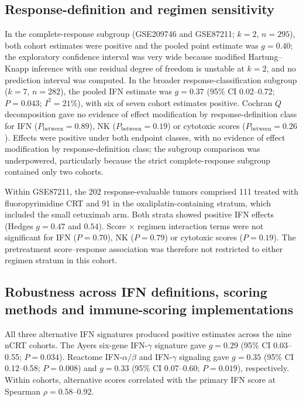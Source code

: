 \documentclass[11pt,a4paper]{article}
\begin{document}
\subsection{Response-definition and regimen sensitivity}

In the complete-response subgroup (GSE209746 and GSE87211; $k=2$, $n=295$), both cohort estimates were positive and the pooled point estimate was $g=0.40$; the exploratory confidence interval was very wide because modified Hartung--Knapp inference with one residual degree of freedom is unstable at $k=2$, and no prediction interval was computed. In the broader response-classification subgroup ($k=7$, $n=282$), the pooled IFN estimate was $g=0.37$ (95\% CI 0.02--0.72; $P=0.043$; $I^2=21\%$), with six of seven cohort estimates positive. Cochran $Q$ decomposition gave no evidence of effect modification by response-definition class for IFN ($P_{\mathrm{between}}=0.89$), NK ($P_{\mathrm{between}}=0.19$) or cytotoxic scores ($P_{\mathrm{between}}=0.26$). Effects were positive under both endpoint classes, with no evidence of effect modification by response-definition class; the subgroup comparison was underpowered, particularly because the strict complete-response subgroup contained only two cohorts.

Within GSE87211, the 202 response-evaluable tumors comprised 111 treated with fluoropyrimidine CRT and 91 in the oxaliplatin-containing stratum, which included the small cetuximab arm. Both strata showed positive IFN effects (Hedges $g=0.47$ and $0.54$). Score $\times$ regimen interaction terms were not significant for IFN ($P=0.70$), NK ($P=0.79$) or cytotoxic scores ($P=0.19$). The pretreatment score--response association was therefore not restricted to either regimen stratum in this cohort.

\subsection{Robustness across IFN definitions, scoring methods and immune-scoring implementations}

All three alternative IFN signatures produced positive estimates across the nine nCRT cohorts. The Ayers six-gene IFN-$\gamma$ signature gave $g=0.29$ (95\% CI 0.03--0.55; $P=0.034$). Reactome IFN-$\alpha/\beta$ and IFN-$\gamma$ signaling gave $g=0.35$ (95\% CI 0.12--0.58; $P=0.008$) and $g=0.33$ (95\% CI 0.07--0.60; $P=0.019$), respectively. Within cohorts, alternative scores correlated with the primary IFN score at Spearman $\rho=0.58$--$0.92$.
\end{document}
